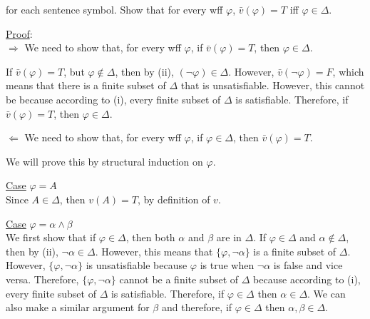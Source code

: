 \documentclass[12pt]{article}	%
\begin{document}
\begin{flushleft}
for each sentence symbol. Show that for every wff $\varphi$, $\bar{v}(\varphi) = T$ iff $\varphi \in \Delta$. \\

\vspace{5mm}

\underline{Proof}: \\
$\Rightarrow$ We need to show that, for every wff $\varphi$, if $\bar{v}(\varphi) = T$, then $\varphi \in \Delta$. \\

\vspace{2mm}

If $\bar{v}(\varphi) = T$, but $\varphi \notin \Delta$, then by (ii), $(\neg\varphi) \in \Delta$. However, $\bar{v}(\neg\varphi) = F$, which means that there is a finite subset of $\Delta$ that is unsatisfiable. However, this cannot be because according to (i), every finite subset of $\Delta$ is satisfiable. Therefore, if $\bar{v}(\varphi) = T$, then $\varphi \in \Delta$. \\

\vspace{5mm}

$\Leftarrow$ We need to show that, for every wff $\varphi$, if $\varphi \in \Delta$, then $\bar{v}(\varphi) = T$. \\

\vspace{2mm}

We will prove this by structural induction on $\varphi$. \\

\vspace{2mm}

\underline{Case} $\varphi = A$ \\
Since $A \in \Delta$, then $v(A) = T$, by definition of $v$. \\

\vspace{2mm}

\underline{Case} $\varphi = \alpha \wedge \beta$ \\
We first show that if $\varphi \in \Delta$, then both $\alpha$ and $\beta$ are in $\Delta$. If $\varphi \in \Delta$ and $\alpha \notin \Delta$, then by (ii), $\neg\alpha \in \Delta$. However, this means that $\{\varphi,\neg\alpha\}$ is a finite subset of $\Delta$. However, $\{\varphi,\neg\alpha\}$ is unsatisfiable because $\varphi$ is true when $\neg\alpha$ is false and vice versa. Therefore, $\{\varphi,\neg\alpha\}$ cannot be a finite subset of $\Delta$ because according to (i), every finite subset of $\Delta$ is satisfiable. Therefore, if $\varphi \in \Delta$ then $\alpha \in \Delta$. We can also make a similar argument for $\beta$ and therefore, if $\varphi \in \Delta$ then $\alpha,\beta \in \Delta$.


\end{flushleft}
\end{document}

